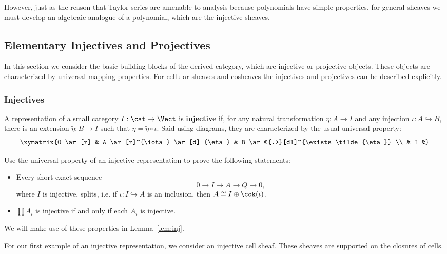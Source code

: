 However, just as the reason that Taylor series are amenable to analysis because polynomials have simple properties, for general sheaves we must develop an algebraic analogue of a polynomial, which are the injective sheaves.

\subsection{Elementary Injectives and Projectives}
\label{subsubsec:elem_inj}

In this section we consider the basic building blocks of the derived category, which are injective or projective objects. These objects are characterized by universal mapping properties. For cellular sheaves and cosheaves the injectives and projectives can be described explicitly.

\subsubsection{Injectives}
\begin{defn}
 A representation of a small category $I:\cat\to\Vect$ is \textbf{injective} if, for any natural transformation $\eta:A\to I$ and any injection $\iota:A\hookrightarrow B$, there is an extension $\tilde{\eta}:B\to I$ such that $\eta=\tilde{\eta}\circ\iota$. Said using diagrams, they are characterized by the usual universal property:
\[
 \xymatrix{0 \ar[r] & A \ar[r]^{\iota} \ar[d]_{\eta} & B \ar@{.>}[dl]^{\exists \tilde{\eta}} \\ & I &}
\]
\end{defn}

\begin{exr}\label{exr:inj_props}
Use the universal property of an injective representation to prove the following statements:
 \begin{itemize}
  \item Every short exact sequence \[0\to I\to A \to Q \to 0,\] where $I$ is injective, splits, i.e. if $\iota: I\hookrightarrow A$ is an inclusion, then $A\cong I\oplus \cok(\iota)$.
  \item $\prod A_i$ is injective if and only if each $A_i$ is injective.
 \end{itemize}
 We will make use of these properties in Lemma~\ref{lem:inj}.
\end{exr}

For our first example of an injective representation, we consider an injective cell sheaf. These sheaves are supported on the closures of cells.

